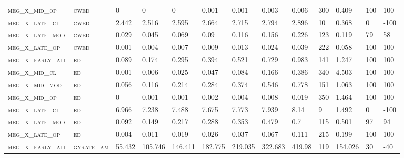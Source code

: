 \begin{landscape}
\begin{center}
\begin{footnotesize}
\begin{longtable}{lllllllllllll}
\textsc{meg\_x\_mid\_op   } & \textsc{cwed      }   & 0        & 0        & 0        & 0.001    & 0.001    & 0.003    & 0.006     & 300    & 0.409         & 100           & 100           \\
\textsc{meg\_x\_late\_cl  } & \textsc{cwed      }   & 2.442    & 2.516    & 2.595    & 2.664    & 2.715    & 2.794    & 2.896     & 10     & 0.368         & 0             & -100          \\
\textsc{meg\_x\_late\_mod } & \textsc{cwed      }   & 0.029    & 0.045    & 0.069    & 0.09     & 0.116    & 0.156    & 0.226     & 123    & 0.119         & 79            & 58            \\
\textsc{meg\_x\_late\_op  } & \textsc{cwed      }   & 0.001    & 0.004    & 0.007    & 0.009    & 0.013    & 0.024    & 0.039     & 222    & 0.058         & 100           & 100           \\
\textsc{meg\_x\_early\_all} & \textsc{ed        }   & 0.089    & 0.174    & 0.295    & 0.394    & 0.521    & 0.729    & 0.983     & 141    & 1.247         & 100           & 100           \\
\textsc{meg\_x\_mid\_cl   } & \textsc{ed        }   & 0.001    & 0.006    & 0.025    & 0.047    & 0.084    & 0.166    & 0.386     & 340    & 4.503         & 100           & 100           \\
\textsc{meg\_x\_mid\_mod  } & \textsc{ed        }   & 0.056    & 0.116    & 0.214    & 0.284    & 0.374    & 0.546    & 0.778     & 151    & 1.063         & 100           & 100           \\
\textsc{meg\_x\_mid\_op   } & \textsc{ed        }   & 0        & 0.001    & 0.001    & 0.002    & 0.004    & 0.008    & 0.019     & 350    & 1.464         & 100           & 100           \\
\textsc{meg\_x\_late\_cl  } & \textsc{ed        }   & 6.966    & 7.238    & 7.488    & 7.675    & 7.773    & 7.939    & 8.14      & 9      & 1.492         & 0             & -100          \\
\textsc{meg\_x\_late\_mod } & \textsc{ed        }   & 0.092    & 0.149    & 0.217    & 0.288    & 0.353    & 0.479    & 0.7       & 115    & 0.501         & 97            & 94            \\
\textsc{meg\_x\_late\_op  } & \textsc{ed        }   & 0.004    & 0.011    & 0.019    & 0.026    & 0.037    & 0.067    & 0.111     & 215    & 0.199         & 100           & 100           \\
\textsc{meg\_x\_early\_all} & \textsc{gyrate\_am}   & 55.432   & 105.746  & 146.411  & 182.775  & 219.035  & 322.683  & 419.98    & 119    & 154.026       & 30            & -40           \\

\end{longtable}
\end{footnotesize}
\end{center}
\end{landscape}
